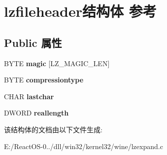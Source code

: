 \hypertarget{structlzfileheader}{}\section{lzfileheader结构体 参考}
\label{structlzfileheader}
\subsection*{Public 属性}
\begin{DoxyCompactItemize}
\item 
\mbox{\label{structlzfileheader_acf495f1b4043513fb091b229859ac3f5}} 
B\+Y\+TE {\bfseries magic} \mbox{[}L\+Z\+\_\+\+M\+A\+G\+I\+C\+\_\+\+L\+EN\mbox{]}
\item 
\mbox{\label{structlzfileheader_a0342d0fd3bd058594616310f3a472d10}} 
B\+Y\+TE {\bfseries compressiontype}
\item 
\mbox{\label{structlzfileheader_ad3e00118b70016c9da76947aac1647ad}} 
C\+H\+AR {\bfseries lastchar}
\item 
\mbox{\label{structlzfileheader_a3bc1d9291c468a4e89f9a7feb679b2b7}} 
D\+W\+O\+RD {\bfseries reallength}
\end{DoxyCompactItemize}


该结构体的文档由以下文件生成\+:\begin{DoxyCompactItemize}
\item 
E\+:/\+React\+O\+S-\/0../dll/win32/kernel32/wine/lzexpand.\+c\end{DoxyCompactItemize}
